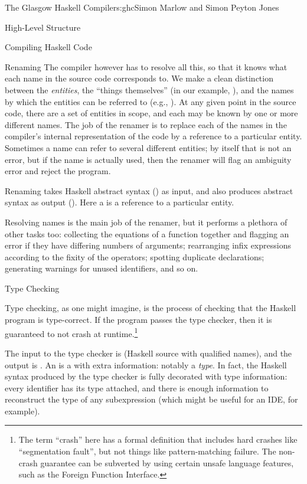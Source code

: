 \begin{aosachapter}{The Glasgow Haskell Compiler}{s:ghc}{Simon Marlow and Simon Peyton Jones}
\begin{aosasect1}{High-Level Structure}
\begin{aosasect2}{Compiling Haskell Code}
\begin{aosasect3}{Renaming}
The compiler however has to resolve all this, so that it knows what
each name in the source code corresponds to.  We make a clean
distinction between the \emph{entities}, the ``things themselves'' (in
our example, ), and the names by which the 
entities can be
referred to (e.g., ).  At any given point in the source code,
there are a set of entities in scope, and each may be known by one or
more different names.  The job of the renamer is to replace each of
the names in the compiler's internal representation of the code by a
reference to a particular entity.  Sometimes a name can refer to
several different entities; by itself that is not an error, but if the
name is actually used, then the renamer will flag an ambiguity error
and reject the program.

Renaming takes Haskell abstract syntax () as
input, and also produces abstract syntax as output ().  
Here a  is a reference to a particular entity.

Resolving names is the main job of the renamer, but it performs a
plethora of other tasks too: collecting the equations of a function
together and flagging an error if they have differing numbers of
arguments; rearranging infix expressions according to the fixity of
the operators; spotting duplicate declarations; generating warnings
for unused identifiers, and so on.

\end{aosasect3}

\begin{aosasect3}{Type Checking}

Type checking, as one might imagine, is the process of checking that
the Haskell program is type-correct.  If the program passes the type
checker, then it is guaranteed to not crash at runtime.\footnote{The
  term ``crash'' here has a formal definition that includes hard
  crashes like ``segmentation fault'', but not things like
  pattern-matching failure.  The non-crash guarantee can be subverted
  by using certain unsafe language features, such as the Foreign
  Function Interface.}

The input to the type checker is  (Haskell source
with qualified names), and the output is .  An
 is a  with extra information: notably a
\emph{type}.  In fact, the Haskell syntax produced by the type checker
is fully decorated with type information: every identifier has its
type attached, and there is enough information to reconstruct the type
of any subexpression (which might be useful for an IDE, for example).


\end{aosasect3}
\end{aosasect2}
\end{aosasect1}
\end{aosachapter}
